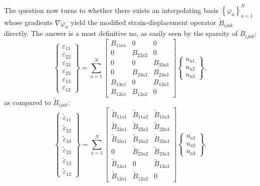 \documentclass[12pt]{book}
\begin{document}
The question now turns to whether there exists an interpolating basis $\left\{ \varphi_a \right\}_{a=1}^N$ whose gradients $\nabla \varphi_a$ yield the modified strain-displacement operator $\tilde{B}_{ijak}$ directly. The answer is a most definitive no, as easily seen by the sparsity of $B_{ijak}$:
\begin{equation}
  \left\{ \begin{array}{c} \varepsilon_{11} \\ \varepsilon_{22} \\ \varepsilon_{33} \\ \varepsilon_{23} \\ \varepsilon_{13} \\ \varepsilon_{12} \end{array} \right\} = \sum_{a = 1}^{N} \left[ \begin{array}{ccc} B_{11a1} & 0 & 0 \\ 0 & B_{22a2} & 0 \\ 0 & 0 & B_{33a3} \\ 0 & B_{23a2} & B_{23a3} \\ B_{13a1} & 0 & B_{13a3} \\ B_{12a1} & B_{12a2} & 0 \end{array} \right] \left\{ \begin{array}{c} u_{a1} \\ u_{a2} \\ u_{a3} \end{array} \right\},
\end{equation}
as compared to $\tilde{B}_{ijak}$:
\begin{equation}
  \left\{ \begin{array}{c} \tilde{\varepsilon}_{11} \\ \tilde{\varepsilon}_{22} \\ \tilde{\varepsilon}_{33} \\ \tilde{\varepsilon}_{23} \\ \tilde{\varepsilon}_{13} \\ \tilde{\varepsilon}_{12} \end{array} \right\} = \sum_{a = 1}^{N} \left[ \begin{array}{ccc} \tilde{B}_{11a1} & \tilde{B}_{11a2} & \tilde{B}_{11a3} \\ \tilde{B}_{22a1} & \tilde{B}_{22a2} & \tilde{B}_{22a3} \\ \tilde{B}_{33a1} & \tilde{B}_{33a2} & \tilde{B}_{33a3} \\ 0 & \tilde{B}_{23a2} & \tilde{B}_{23a3} \\ \tilde{B}_{13a1} & 0 & \tilde{B}_{13a3} \\ \tilde{B}_{12a1} & \tilde{B}_{12a2} & 0 \end{array} \right] \left\{ \begin{array}{c} u_{a1} \\ u_{a2} \\ u_{a3} \end{array} \right\}.
\end{equation}
\end{document}
